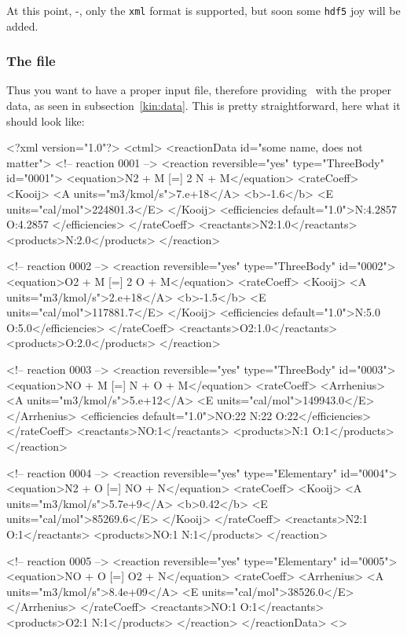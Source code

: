 At this point, \antioch-\theversion, only the \verb!xml! format is
supported, but soon some \verb!hdf5! joy will be added.

\subsubsection{The file}

Thus you want to have a proper input file, therefore providing
\Antioch\ with the proper data, as seen in subsection~\ref{kin:data}.
This is pretty straightforward, here what it should look like:
\begin{xml}
<?xml version="1.0"?>
<ctml>
  <reactionData id="some name, does not matter">
    <!-- reaction 0001    -->
    <reaction reversible="yes" type="ThreeBody" id="0001">
      <equation>N2 + M [=] 2 N + M</equation>
      <rateCoeff>
        <Kooij>
           <A units="m3/kmol/s">7.e+18</A>
           <b>-1.6</b>
           <E units="cal/mol">224801.3</E>
        </Kooij>
        <efficiencies default="1.0">N:4.2857 O:4.2857 </efficiencies>
      </rateCoeff>
      <reactants>N2:1.0</reactants>
      <products>N:2.0</products>
    </reaction>

    <!-- reaction 0002    -->
    <reaction reversible="yes" type="ThreeBody" id="0002">
      <equation>O2 + M [=] 2 O + M</equation>
      <rateCoeff>
        <Kooij>
           <A units="m3/kmol/s">2.e+18</A>
           <b>-1.5</b>
           <E units="cal/mol">117881.7</E>
        </Kooij>
        <efficiencies default="1.0">N:5.0 O:5.0</efficiencies>
      </rateCoeff>
      <reactants>O2:1.0</reactants>
      <products>O:2.0</products>
    </reaction>

    <!-- reaction 0003    -->
    <reaction reversible="yes" type="ThreeBody" id="0003">
      <equation>NO + M [=] N + O + M</equation>
      <rateCoeff>
        <Arrhenius>
           <A units="m3/kmol/s">5.e+12</A>
           <E units="cal/mol">149943.0</E>
        </Arrhenius>
        <efficiencies default="1.0">NO:22 N:22 O:22</efficiencies>
      </rateCoeff>
      <reactants>NO:1</reactants>
      <products>N:1 O:1</products>
    </reaction>

    <!-- reaction 0004    -->
    <reaction reversible="yes" type="Elementary" id="0004">
      <equation>N2 + O [=] NO + N</equation>
      <rateCoeff>
        <Kooij>
           <A units="m3/kmol/s">5.7e+9</A>
           <b>0.42</b>
           <E units="cal/mol">85269.6</E>
        </Kooij>
      </rateCoeff>
      <reactants>N2:1 O:1</reactants>
      <products>NO:1 N:1</products>
    </reaction>

    <!-- reaction 0005    -->
    <reaction reversible="yes" type="Elementary" id="0005">
      <equation>NO + O [=] O2 + N</equation>
      <rateCoeff>
        <Arrhenius>
           <A units="m3/kmol/s">8.4e+09</A>
           <E units="cal/mol">38526.0</E>
        </Arrhenius>
      </rateCoeff>
      <reactants>NO:1 O:1</reactants>
      <products>O2:1 N:1</products>
    </reaction>
  </reactionData>
<\ctml>
\end{xml}

